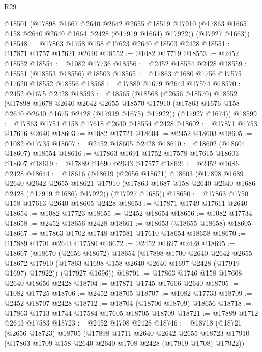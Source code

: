 \begin{lexlean}{R29}
\begin{coremodule}
      @18501
      (@17898
        @1667
        @2640
        @2642
        @2655
        @18519
        @17910
        (@17863 @1665 @158 @2640 @2640 @1664 @2428 (@17919 @1664) @17922))
      (@17927 @1663))
@18548 := @17863 @1758 @158 @17623 @2640 @18503 @2428
@18551 := @17871 @1757 @17621 @2640
@18552 := @1082 @17719
@18553 := @2452 @18552
@18554 := @1082 @17736
@18556 := @2452 @18554 @2428
@18559 := @18551 (@18553 @18556) @18503
@18565 := @17863 @1680 @1756 @17575 @17620 @18552 @18556
@18568 := @17889 @1679 @2643 @17574
@18570 := @2452 @1675 @2428
@18593 := @18565
    (@18568
      (@2656 @18570)
      @18552
      (@17898
        @1678
        @2640
        @2642
        @2655
        @18570
        @17910
        (@17863 @1676 @158 @2640 @2640 @1675 @2428 (@17919 @1675) @17922))
      (@17927 @1674))
@18599 := @17863 @1754 @158 @17618 @2640 @18554 @2428
@18602 := @17871 @1753 @17616 @2640
@18603 := @1082 @17721
@18604 := @2452 @18603
@18605 := @1082 @17735
@18607 := @2452 @18605 @2428
@18610 := @18602 (@18604 @18607) @18554
@18616 := @17863 @1691 @1752 @17578 @17615 @18603 @18607
@18619 := @17889 @1690 @2643 @17577
@18621 := @2452 @1686 @2428
@18644 := @18616
    (@18619
      (@2656 @18621)
      @18603
      (@17898
        @1689
        @2640
        @2642
        @2655
        @18621
        @17910
        (@17863 @1687 @158 @2640 @2640 @1686 @2428 (@17919 @1686) @17922))
      (@17927 @1685))
@18650 := @17863 @1750 @158 @17613 @2640 @18605 @2428
@18653 := @17871 @1749 @17611 @2640
@18654 := @1082 @17723
@18655 := @2452 @18654
@18656 := @1082 @17734
@18658 := @2452 @18656 @2428
@18661 := @18653 (@18655 @18658) @18605
@18667 := @17863 @1702 @1748 @17581 @17610 @18654 @18658
@18670 := @17889 @1701 @2643 @17580
@18672 := @2452 @1697 @2428
@18695 := @18667
    (@18670
      (@2656 @18672)
      @18654
      (@17898
        @1700
        @2640
        @2642
        @2655
        @18672
        @17910
        (@17863 @1698 @158 @2640 @2640 @1697 @2428 (@17919 @1697) @17922))
      (@17927 @1696))
@18701 := @17863 @1746 @158 @17608 @2640 @18656 @2428
@18704 := @17871 @1745 @17606 @2640
@18705 := @1082 @17725
@18706 := @2452 @18705
@18707 := @1082 @17733
@18709 := @2452 @18707 @2428
@18712 := @18704 (@18706 @18709) @18656
@18718 := @17863 @1713 @1744 @17584 @17605 @18705 @18709
@18721 := @17889 @1712 @2643 @17583
@18723 := @2452 @1708 @2428
@18746 := @18718
    (@18721
      (@2656 @18723)
      @18705
      (@17898
        @1711
        @2640
        @2642
        @2655
        @18723
        @17910
        (@17863 @1709 @158 @2640 @2640 @1708 @2428 (@17919 @1708) @17922))

\end{coremodule}
\end{lexlean}
